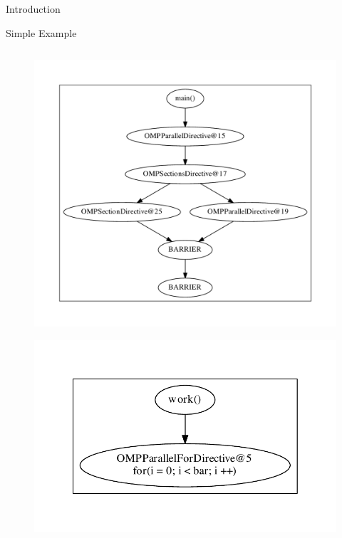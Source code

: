 \documentclass[xcolor=dvipsnames]{beamer}
\begin{document}
\begin{section}{Introduction}
\begin{frame}[fragile]{\hskip 0.3cm Simple Example}
\begin{columns}
\begin{column}{6.5cm}
\begin{figure}
\includegraphics[scale=0.3]{main.pdf}
\end{figure}
\vskip -1.5cm
\begin{figure}
\includegraphics[scale=0.3]{work.pdf}
\end{figure}

\end{column}

\end{columns}

\end{frame}
















\end{section}
\end{document}
